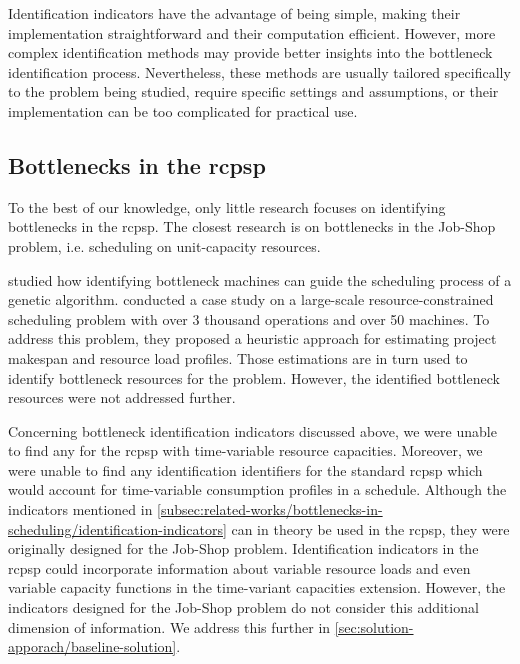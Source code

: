 Identification indicators have the advantage of being simple,
making their implementation straightforward and their computation efficient.
However, more complex identification methods may provide better insights
into the bottleneck identification process.
Nevertheless, these methods are usually tailored specifically to the problem being studied,
require specific settings and assumptions,
or their implementation can be too complicated for practical use.

\subsection{Bottlenecks in the \acs{rcpsp}} \label{subsec:related-works/bottlenecks-in-scheduling/bottlenecks-in-the-rcpsp}

To the best of our knowledge, only little research focuses on identifying bottlenecks in the \ac{rcpsp}.
The closest research is on bottlenecks in the Job-Shop problem,
i.e. scheduling on unit-capacity resources.

\citet{Luo2023} studied how identifying bottleneck machines can guide the scheduling
process of a genetic algorithm.
\citet{Arkhipov2017} conducted a case study on a large-scale resource-constrained scheduling problem
with over 3 thousand operations and over 50 machines.
To address this problem, they proposed a heuristic approach for estimating project makespan
and resource load profiles.
Those estimations are in turn used to identify bottleneck resources for the problem.
However, the identified bottleneck resources were not addressed further.

Concerning bottleneck identification indicators discussed above,
we were unable to find any for the \ac{rcpsp} with time-variable resource capacities.
Moreover, we were unable to find any identification identifiers for the standard \ac{rcpsp}
which would account for time-variable consumption profiles in a schedule.
Although the indicators mentioned in \cref{subsec:related-works/bottlenecks-in-scheduling/identification-indicators}
can in theory be used in the \ac{rcpsp},
they were originally designed for the Job-Shop problem.
Identification indicators in the \ac{rcpsp} could incorporate information about
variable resource loads and even
variable capacity functions in the time-variant capacities extension.
However, the indicators designed for the Job-Shop problem do not consider
this additional dimension of information.
We address this further in \cref{sec:solution-apporach/baseline-solution}.

